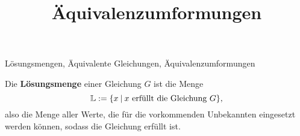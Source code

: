 \documentclass[]{uebungsblatt}
\title{Äquivalenzumformungen}
\begin{document}
\maketitle
\begin{contents}
    Lösungsmengen, Äquivalente Gleichungen, Äquivalenzumformungen
\end{contents}


\begin{definition}
    Die \textbf{Lösungsmenge} einer Gleichung $G$ ist die Menge 
    \[\mathbb{L}:=\{x\:|\:x~\text{erfüllt die Gleichung~}G\},\]
    also die Menge aller Werte, die für die vorkommenden Unbekannten eingesetzt werden können, sodass die Gleichung erfüllt ist.
\end{definition}
%
\end{document}
